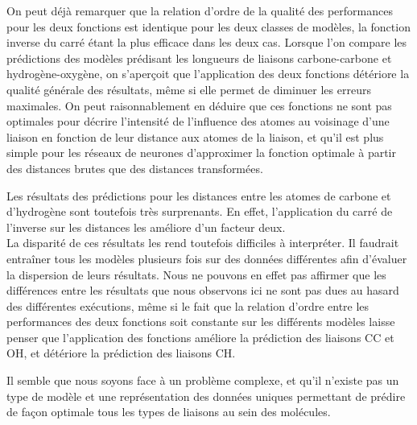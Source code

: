 \par On peut déjà remarquer que la relation d'ordre de la qualité des performances pour les deux fonctions est identique pour les deux classes de modèles, la fonction inverse du carré étant la plus efficace dans les deux cas. Lorsque l'on compare les prédictions des modèles prédisant les longueurs de liaisons carbone-carbone et hydrogène-oxygène, on s'aperçoit que l'application des deux fonctions détériore la qualité générale des résultats, même si elle permet de diminuer les erreurs maximales. On peut raisonnablement en déduire que ces fonctions ne sont pas optimales pour décrire l'intensité de l'influence des atomes au voisinage d'une liaison en fonction de leur distance aux atomes de la liaison, et qu'il est plus simple pour les réseaux de neurones d'approximer la fonction optimale à partir des distances brutes que des distances transformées.
\par Les résultats des prédictions pour les distances entre les atomes de carbone et d'hydrogène sont toutefois très surprenants. En effet, l'application du carré de l'inverse sur les distances les améliore d'un facteur deux. \\
La disparité de ces résultats les rend toutefois difficiles à interpréter. Il faudrait entraîner tous les modèles plusieurs fois sur des données différentes afin d'évaluer la dispersion de leurs résultats. Nous ne pouvons en effet pas affirmer que les différences entre les résultats que nous observons ici ne sont pas dues au hasard des différentes exécutions, même si le fait que la relation d'ordre entre les performances des deux fonctions soit constante sur les différents modèles laisse  penser que l'application des fonctions améliore la prédiction des liaisons CC et OH, et détériore la prédiction des liaisons CH.\\
\par Il semble que nous soyons face à un problème complexe, et qu'il n'existe pas un type de modèle et une représentation des données uniques permettant de prédire de façon optimale tous les types de liaisons au sein des molécules.

